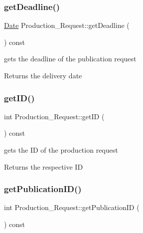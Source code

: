 \subsubsection{\texorpdfstring{get\+Deadline()}{getDeadline()}}
{\footnotesize\ttfamily \hyperlink{class_date}{Date} Production\+\_\+\+Request\+::get\+Deadline (\begin{DoxyParamCaption}{ }\end{DoxyParamCaption}) const}



gets the deadline of the publication request 

\begin{DoxyReturn}{Returns}
the delivery date 
\end{DoxyReturn}
\mbox{\label{class_production___request_ae2448a51f3bdab909bdc53f2e5bae666}} 
\subsubsection{\texorpdfstring{get\+I\+D()}{getID()}}
{\footnotesize\ttfamily int Production\+\_\+\+Request\+::get\+ID (\begin{DoxyParamCaption}{ }\end{DoxyParamCaption}) const}



gets the ID of the production request 

\begin{DoxyReturn}{Returns}
the respective ID 
\end{DoxyReturn}
\mbox{\label{class_production___request_aafa7c4bbaae9dc72c8954a6e1eaff817}} 
\subsubsection{\texorpdfstring{get\+Publication\+I\+D()}{getPublicationID()}}
{\footnotesize\ttfamily int Production\+\_\+\+Request\+::get\+Publication\+ID (\begin{DoxyParamCaption}{ }\end{DoxyParamCaption}) const}



